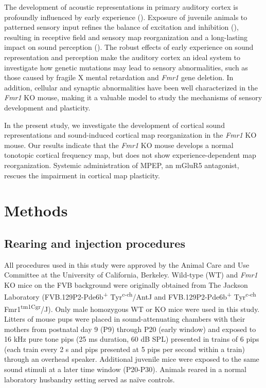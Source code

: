The development of acoustic representations in primary auditory cortex is profoundly influenced by early experience (\cite{Zhang2001, DeVillers-Sidani2007, Insanally2009, Popescu2010}). Exposure of juvenile animals to patterned sensory input refines the balance of excitation and inhibition (\cite{Dorrn2010, Sun2010}), resulting in receptive field and sensory map reorganization and a long-lasting impact on sound perception (\cite{Han2007}). The robust effects of early experience on sound representation and perception make the auditory cortex an ideal system to investigate how genetic mutations may lead to sensory abnormalities, such as those caused by fragile X mental retardation and \textit{Fmr1} gene deletion. In addition, cellular and synaptic abnormalities have been well characterized in the \textit{Fmr1} KO mouse, making it a valuable model to study the mechanisms of sensory development and plasticity.

In the present study, we investigate the development of cortical sound representations and sound-induced cortical map reorganization in the \textit{Fmr1} KO mouse. Our results indicate that the \textit{Fmr1} KO mouse develops a normal tonotopic cortical frequency map, but does not show experience-dependent map reorganization. Systemic administration of MPEP, an mGluR5 antagonist, rescues the impairment in cortical map plasticity.

\section{Methods}

\subsection{Rearing and injection procedures}

All procedures used in this study were approved by the Animal Care and Use Committee at the University of California, Berkeley. Wild-type (WT) and \textit{Fmr1} KO mice on the FVB background were originally obtained from The Jackson Laboratory (FVB.129P2-Pde6b\textsuperscript{+} Tyr\textsuperscript{c-ch}/AntJ and FVB.129P2-Pde6b\textsuperscript{+} Tyr\textsuperscript{c-ch} Fmr1\textsuperscript{tm1Cgr}/J). Only male homozygous WT or KO mice were used in this study. Litters of mouse pups were placed in sound-attenuating chambers with their mothers from postnatal day 9 (P9) through P20 (early window) and exposed to 16 kHz pure tone pips (25 ms duration, 60 dB SPL) presented in trains of 6 pips (each train every 2 s and pips presented at 5 pips per second within a train) through an overhead speaker. Additional juvenile mice were exposed to the same sound stimuli at a later time window (P20-P30). Animals reared in a normal laboratory husbandry setting served as na\"ive controls.

